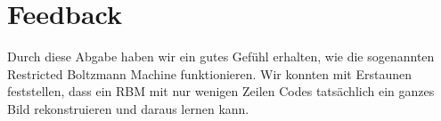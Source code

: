 \documentclass{article}
\begin{document}
\section{Feedback}
Durch diese Abgabe haben wir ein gutes Gefühl erhalten, wie die sogenannten Restricted Boltzmann Machine funktionieren. Wir konnten mit Erstaunen feststellen, dass ein RBM mit nur wenigen Zeilen Codes tatsächlich ein ganzes Bild rekonstruieren und daraus lernen kann.
\end{document}

